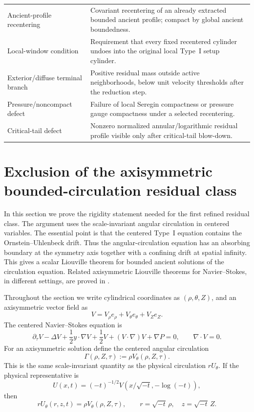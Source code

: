 \documentclass[11pt]{amsart}
\numberwithin{equation}{section}
\theoremstyle{plain}
\theoremstyle{definition}
\theoremstyle{remark}
\begin{document}
\begin{longtable}{@{}L{0.28\textwidth}L{0.66\textwidth}@{}}
Ancient-profile recentering & Covariant recentering of an already extracted
bounded ancient profile; compact by global ancient boundedness.\\
Local-window condition & Requirement that every fixed recentered cylinder
undoes into the original local Type~I setup cylinder.\\
Exterior/diffuse terminal branch & Positive residual mass outside active
neighborhoods, below unit velocity thresholds after the reduction step.\\
Pressure/noncompact defect & Failure of local Seregin compactness or pressure
gauge compactness under a selected recentering.\\
Critical-tail defect & Nonzero normalized annular/logarithmic residual profile
visible only after critical-tail blow-down.\\
\hline
\end{longtable}

\section{Exclusion of the axisymmetric bounded-circulation residual class}
\label{sec:R1-exclusion}

In this section we prove the rigidity statement needed for the first refined
residual class.  The argument uses the scale-invariant angular circulation in
centered variables.  The essential point is that the centered Type~I equation
contains the Ornstein--Uhlenbeck drift.  Thus the angular-circulation equation
has an absorbing boundary at the symmetry axis together with a confining drift
at spatial infinity.  This gives a scalar Liouville theorem for bounded ancient
solutions of the circulation equation.  Related axisymmetric Liouville theorems
for Navier--Stokes, in different settings, are proved in
\cite{LZZ2017,LRZ2022}.

Throughout the section we write cylindrical coordinates as
\((\rho,\theta,Z)\), and an axisymmetric vector field as
\[
   V=V_\rho e_\rho+V_\theta e_\theta+V_Z e_Z .
\]
The centered Navier--Stokes equation is
\begin{equation}\label{eq:centered-R1}
   \partial_\tau V-\Delta V+\frac12 y\cdot\nabla V+\frac12 V
   +(V\cdot\nabla)V+\nabla P=0,
   \qquad \nabla\cdot V=0 .
\end{equation}
For an axisymmetric solution define the centered angular circulation
\begin{equation}\label{eq:centered-Gamma-def}
   \Gamma(\rho,Z,\tau):=\rho V_\theta(\rho,Z,\tau).
\end{equation}
This is the same scale-invariant quantity as the physical circulation
\(rU_\theta\).  If the physical representative is
\[
   U(x,t)=(-t)^{-1/2}V(x/\sqrt{-t},-\log(-t)),
\]
then
\[
   rU_\theta(r,z,t)=\rho V_\theta(\rho,Z,\tau),
   \qquad r=\sqrt{-t}\,\rho,
   \quad z=\sqrt{-t}\,Z.
\]
\end{document}
